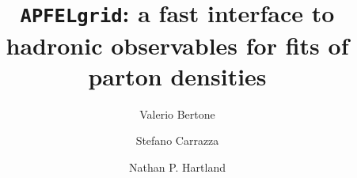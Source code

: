 \documentclass[preprint,12pt]{elsarticle}
\begin{document}
 
 \begin{frontmatter}



\title{{\tt APFELgrid}: a fast interface to hadronic observables for
  fits of parton densities}


\author[a]{Valerio Bertone}
\author[b]{Stefano Carrazza}
\author[a]{Nathan P. Hartland}

\address[a]{Rudolf Peierls Centre for Theoretical Physics,\\ 1 Keble Road, University of Oxford, OX1 3NP, Oxford, UK}
\address[b]{Theoretical Physics Department, CERN, Geneva, Switzerland}


\end{frontmatter}
\end{document}
